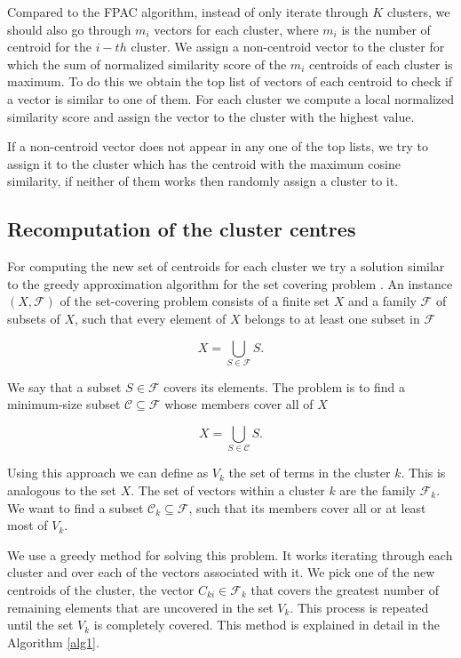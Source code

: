 \documentclass[runningheads]{llncs}
\begin{document}
Compared to the FPAC algorithm, instead of only iterate through
$K$ clusters, we should also go through $m_i$ vectors for each 
cluster, where $m_i$ is the number of centroid for the $i-th$ cluster.
We assign a non-centroid vector to the cluster for which the sum of 
normalized similarity score of the $m_i$ centroids of each cluster is maximum.
To do this we obtain the top list of vectors of each centroid to check if a vector is similar to one of them. For each cluster we compute a local normalized similarity score and assign the vector to the cluster with the highest value.

If a non-centroid vector does not appear in any one of the
top lists, we try to assign it to the cluster which has the centroid with the maximum cosine similarity, if neither of them works then randomly assign a cluster to it.


\subsection{Recomputation of the cluster centres}

For computing the new set of centroids for each cluster
we try a solution similar to the greedy approximation
algorithm  for the set covering problem \cite{cormen_leiserson_rivest_stein_2009}.
An instance $(X, \mathcal{F})$ of the set-covering problem consists of
a finite set $X$ and a family $\mathcal{F}$ of subsets of $X$, such that 
every element of $X$ belongs to at least one subset in $\mathcal{F}$

\[
X = \bigcup_{S\in \mathcal{F}} S.
\]

We say that a subset $S\in \mathcal{F}$ covers its elements. The problem is to find a minimum-size subset $\mathcal{C} \subseteq \mathcal{F}$ whose members cover all of $X$

\[
X = \bigcup_{S \in \mathcal{C}} S.
\]

Using this approach we can define as $V_k$ the set of terms in the cluster $k$. This is analogous to the set $X$. The set of vectors within a cluster $k$ are the family $\mathcal{F}_k$. We want to find a subset $\mathcal{C}_k \subseteq \mathcal{F}$, such that its members cover all or at least most of $V_k$.

We use a greedy method for solving this problem. It works iterating
through each cluster and over each of the vectors associated with it. We pick one of the new centroids of the cluster, the vector $C_{ki} \in \mathcal{F}_k$ that covers the greatest number of remaining elements that are uncovered in the set $V_k$. This process is repeated until the set
$V_k$ is completely covered.
This method is explained in detail in the Algorithm \ref{alg1}.
\end{document}
